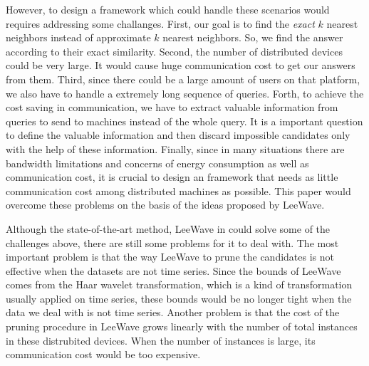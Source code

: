 However, to design a framework which could handle these scenarios would requires addressing some challanges.  First, our goal is to find the \emph{exact} $k$ nearest neighbors instead of approximate $k$ nearest neighbors.  So, we find the answer according to their exact similarity.  Second, the number of distributed devices could be very large. It would cause huge communication cost to get our answers from them.  Third, since there could be a large amount of users on that platform, we also have to handle a extremely long sequence of queries.  Forth, to achieve the cost saving in communication, we have to extract valuable information from queries to send to machines instead of the whole query.  It is a important question to define the valuable information and then discard impossible candidates only with the help of these information.  Finally, since in many situations there are bandwidth limitations and concerns of energy consumption as well as communication cost, it is crucial to design an framework that needs as little communication cost among distributed machines as possible.  This paper would overcome these problems on the basis of the ideas proposed by LeeWave.

Although the state-of-the-art method, LeeWave in \cite{LeeWave} could solve some of the challenges above, there are still some problems for it to deal with.  The most important problem is that the way LeeWave to prune the candidates is not effective when the datasets are not time series.  Since the bounds of LeeWave comes from the Haar wavelet transformation, which is a kind of transformation usually applied on time series, these bounds would be no longer tight when the data we deal with is not time series.  Another problem is that the cost of the pruning procedure in LeeWave grows linearly with the number of total instances in these distrubited devices.  When the number of instances is large, its communication cost would be too expensive.

